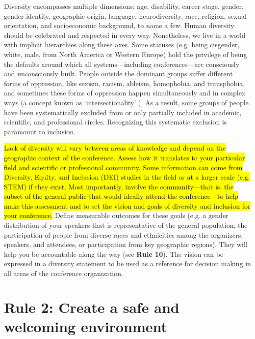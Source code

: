 \documentclass[10pt,letterpaper]{article}
\begin{document}
Diversity encompasses multiple dimensions: age, disability, career stage, gender, gender identity, geographic origin, language, neurodiversity, race, religion, sexual orientation, and socioeconomic background, to name a few.
Human diversity should be celebrated and respected in every way. 
Nonetheless, we live in a world with implicit hierarchies along these axes. 
Some statuses (e.g. being cisgender, white, male, from North America or Western Europe) hold the privilege of being the defaults around which all systems—including conferences—are consciously and unconsciously built. 
People outside the dominant groups suffer different forms of oppression, like sexism, racism, ableism, homophobia, and transphobia, and sometimes these forms of oppression happen simultaneously and in complex ways (a concept known as `intersectionality' \cite{crenshawDemarginalizingIntersectionRace1989}).
As a result, some groups of people have been systematically excluded from or only partially included in academic, scientific, and professional circles.
Recognizing this systematic exclusion is paramount to inclusion.

\hl{
Lack of diversity will vary between areas of knowledge and depend on the geographic context of the conference.
Assess how it translates to your particular field and scientific or professional community.
Some information can come from Diversity, Equity, and Inclusion (DEI) studies in the field or at a larger scale (e.g. STEM) if they exist. 
Most importantly, involve the community---that is, the subset of the general public that would ideally attend the conference---to help make this assessment and to set the vision and goals of diversity and inclusion for your conference.} 
Define measurable outcomes for these goals (e.g. a gender distribution of your speakers that is representative of the general population, the participation of people from diverse races and ethnicities among the organizers, speakers, and attendees, or participation from key geographic regions). 
They will help you be accountable along the way (see \textbf{Rule 10}).  %
The vision can be expressed in a diversity statement to be used as a reference for decision making in all areas of the conference organization.

\section*{Rule 2: Create a safe and welcoming environment}
\label{rule_inclusion}
\end{document}
